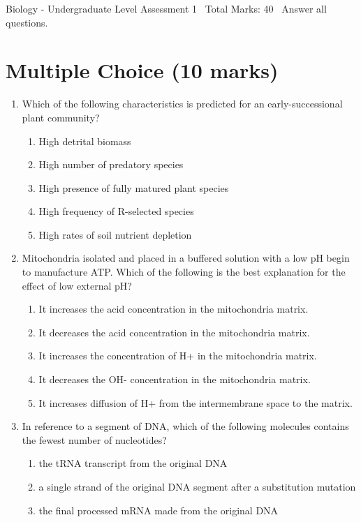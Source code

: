 \documentclass[12pt]{article}
\begin{document}
\begin{center}
Biology - Undergraduate Level Assessment 1 \
Total Marks: 40 \
Answer all questions.
\end{center}

\section*{Multiple Choice (10 marks)}
\begin{enumerate}[label=\arabic*.]
\item Which of the following characteristics is predicted for an early-successional plant community?
\begin{enumerate}[label=(\alph*)]
    \item High detrital biomass
    \item High number of predatory species
    \item High presence of fully matured plant species
    \item High frequency of R-selected species
    \item High rates of soil nutrient depletion
\end{enumerate}
\item Mitochondria isolated and placed in a buffered solution with a low pH begin to manufacture ATP. Which of the following is the best explanation for the effect of low external pH?
\begin{enumerate}[label=(\alph*)]
    \item It increases the acid concentration in the mitochondria matrix.
    \item It decreases the acid concentration in the mitochondria matrix.
    \item It increases the concentration of H+ in the mitochondria matrix.
    \item It decreases the OH- concentration in the mitochondria matrix.
    \item It increases diffusion of H+ from the intermembrane space to the matrix.
\end{enumerate}
\item In reference to a segment of DNA, which of the following molecules contains the fewest number of nucleotides?
\begin{enumerate}[label=(\alph*)]
    \item the tRNA transcript from the original DNA
    \item a single strand of the original DNA segment after a substitution mutation
    \item the final processed mRNA made from the original DNA

\end{enumerate}
\end{enumerate}
\end{document}
